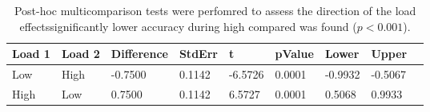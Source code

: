 \begin{table}
\centering
\begin{tabular}[0.2em]{@{}lllllllll@{}}\toprule
Load 1 & Load 2 & Difference & StdErr & t & pValue & Lower & Upper\\\toprule[0.2em]
Low & High & -0.7500 & 0.1142 & -6.5726 & 0.0001 & -0.9932 & -0.5067 \\\midrule
High & Low & 0.7500 & 0.1142 & 6.5727 & 0.0001 & 0.5068 & 0.9933 \\\bottomrule[0.2em]
\end{tabular}
\caption{Post-hoc multicomparison tests were perfomred to assess the direction of the load effectssignificantly lower accuracy during high compared was found ($p<0.001$).\label{tabel:behPHStudy2Acc}}
\end{table}
